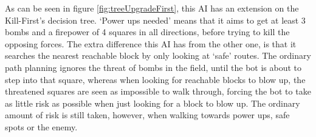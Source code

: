 As can be seen in figure \ref{fig:treeUpgradeFirst}, this AI has an extension on the
Kill-First's decision tree. `Power ups needed' means that it aims to get at least 3 bombs and a
firepower of 4 squares in all directions, before trying to kill the opposing
forces. The extra difference this AI has from the other one, is that it searches
the nearest reachable block by only looking at `safe' routes. The ordinary path
planning ignores the threat of bombs in the field, until the bot is about to
step into that square, whereas when looking for reachable blocks to blow up, the
threatened squares are seen as impossible to walk through, forcing the bot to
take as little risk as possible when just looking for a block to blow up. The
ordinary amount of risk is still taken, however, when walking towards power ups,
safe spots or the enemy. 

